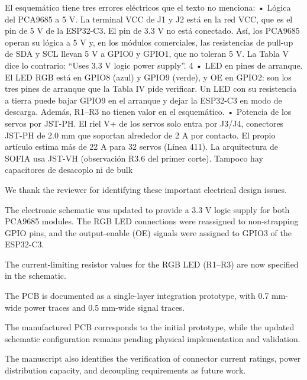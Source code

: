 \documentclass{LabDSTresponse}
\begin{document}
	{El esquemático tiene tres errores eléctricos que el texto no menciona:
		• Lógica del PCA9685 a 5 V. La terminal VCC de J1 y J2 está en la red VCC, que es el pin de 5 V de la ESP32-C3.
		El pin de 3.3 V no está conectado. Así, los PCA9685 operan su lógica a 5 V y, en los módulos comerciales, las
		resistencias de pull-up de SDA y SCL llevan 5 V a GPIO0 y GPIO1, que no toleran 5 V. La Tabla V dice lo contrario:
		“Uses 3.3 V logic power supply”.
		4
		• LED en pines de arranque. El LED RGB está en GPIO8 (azul) y GPIO9 (verde), y OE en GPIO2: son los tres pines
		de arranque que la Tabla IV pide verificar. Un LED con su resistencia a tierra puede bajar GPIO9 en el arranque y
		dejar la ESP32-C3 en modo de descarga. Además, R1–R3 no tienen valor en el esquemático.
		• Potencia de los servos por JST-PH. El riel V+ de los servos solo entra por J3/J4, conectores JST-PH de 2.0 mm
		que soportan alrededor de 2 A por contacto. El propio artículo estima más de 22 A para 32 servos (Línea 411). La
		arquitectura de SOFIA usa JST-VH (observación R3.6 del primer corte).
		Tampoco hay capacitores de desacoplo ni de bulk}
	{We thank the reviewer for identifying these important electrical design issues.
		
		The electronic schematic was updated to
		provide a 3.3 V logic supply for both
		PCA9685 modules. The RGB LED connections
		were reassigned to non-strapping GPIO pins,
		and the output-enable (OE) signals were
		assigned to GPIO3 of the ESP32-C3.
		
		The current-limiting resistor values
		for the RGB LED (R1--R3) are now specified
		in the schematic.
		
		The PCB is documented as a single-layer
		integration prototype, with 0.7 mm-wide
		power traces and 0.5 mm-wide signal traces.
		
		The manufactured PCB corresponds to the
		initial prototype, while the updated
		schematic configuration remains pending
		physical implementation and validation.
		
		The manuscript also identifies the
		verification of connector current ratings,
		power distribution capacity, and
		decoupling requirements as future work.}
	
\end{document}
